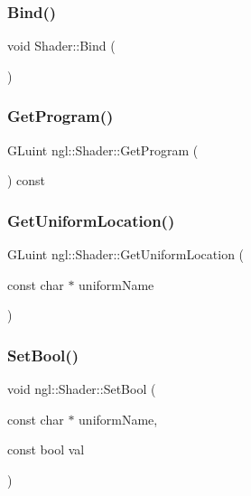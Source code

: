 \subsubsection{\texorpdfstring{Bind()}{Bind()}}
{\footnotesize\ttfamily void Shader\+::\+Bind (\begin{DoxyParamCaption}{ }\end{DoxyParamCaption})}

\mbox{\label{classngl_1_1_shader_a705fa8fbd14d37c36a929c9befa69de0}} 
\subsubsection{\texorpdfstring{Get\+Program()}{GetProgram()}}
{\footnotesize\ttfamily G\+Luint ngl\+::\+Shader\+::\+Get\+Program (\begin{DoxyParamCaption}{ }\end{DoxyParamCaption}) const}

\mbox{\label{classngl_1_1_shader_ab64b54fa47834a799e2fe9bb51f488ed}} 
\subsubsection{\texorpdfstring{Get\+Uniform\+Location()}{GetUniformLocation()}}
{\footnotesize\ttfamily G\+Luint ngl\+::\+Shader\+::\+Get\+Uniform\+Location (\begin{DoxyParamCaption}\item[{const char $\ast$}]{uniform\+Name }\end{DoxyParamCaption})}

\mbox{\label{classngl_1_1_shader_a17264a5e88238815deea88062b9af83d}} 
\subsubsection{\texorpdfstring{Set\+Bool()}{SetBool()}}
{\footnotesize\ttfamily void ngl\+::\+Shader\+::\+Set\+Bool (\begin{DoxyParamCaption}\item[{const char $\ast$}]{uniform\+Name,  }\item[{const bool}]{val }\end{DoxyParamCaption})}


